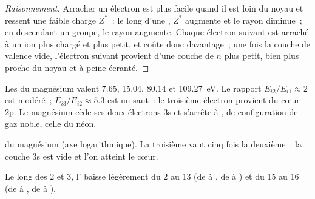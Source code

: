 \begin{proof}[Raisonnement]
Arracher un électron est plus facile quand il est loin du noyau et
ressent une faible charge $Z^{*}$~: le long d'une , $Z^{*}$
augmente et le rayon diminue~; en descendant un groupe, le rayon
augmente. Chaque électron suivant est arraché à un ion plus chargé et
plus petit, et coûte donc davantage~; une fois la couche de valence
vide, l'électron suivant provient d'une couche de $n$ plus petit, bien
plus proche du noyau et à peine écranté.
\end{proof}

\begin{example}[Le magnésium]\label{ex:b1:periodicity:magnesium}
Les  du magnésium valent 7.65, 15.04,
80.14 et \qty{109.27}{eV}. Le rapport $E_{i2}/E_{i1} \approx 2$ est
modéré~; $E_{i3}/E_{i2} \approx 5.3$ est un saut~: le troisième électron
provient du cœur 2p. Le magnésium cède ses deux électrons 3s et s'arrête
à , de configuration de gaz noble, celle du néon.
\end{example}

\begin{omfigure}

{\small {} du magnésium (axe
logarithmique). La troisième vaut cinq fois la deuxième~: la couche 3s
est vide et l'on atteint le cœur.}
\end{omfigure}

\begin{proposition}\label{prop:b1:periodicity:ie-anomalies}
Le long des  2 et 3, l' baisse
légèrement du  2 au  13 (de  à , de  à
) et du  15 au  16 (de  à , de  à
).
\end{proposition}

